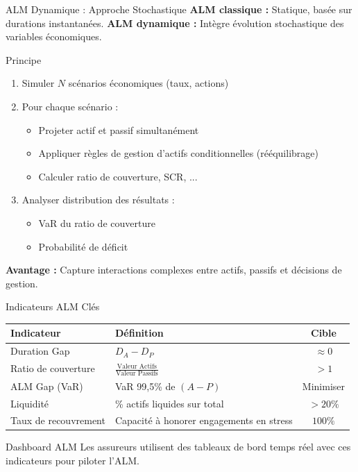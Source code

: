 \documentclass[10pt,aspectratio=169]{beamer}
\begin{document}
\begin{frame}{ALM Dynamique : Approche Stochastique}
\textbf{ALM classique : } Statique, basée sur durations instantanées.
\textbf{ALM dynamique : } Intègre évolution stochastique des variables économiques.

\vspace{0.3cm}
\begin{block}{Principe}
\begin{enumerate}
    \item Simuler $N$ scénarios économiques (taux, actions)
    \item Pour chaque scénario :
    \begin{itemize}
        \item Projeter actif et passif simultanément
        \item Appliquer règles de gestion d'actifs conditionnelles (rééquilibrage)
        \item Calculer ratio de couverture, SCR, ...
    \end{itemize}
    \item Analyser distribution des résultats :
    \begin{itemize}
        \item VaR du ratio de couverture
        \item Probabilité de déficit
    \end{itemize}
\end{enumerate}
\end{block}

\vspace{0.3cm}
\textbf{Avantage : } Capture interactions complexes entre actifs, passifs et décisions de gestion.
\end{frame}

\begin{frame}{Indicateurs ALM Clés}
\begin{table}
\centering
\small
\begin{tabular}{lp{6cm}c}
\toprule
\textbf{Indicateur} & \textbf{Définition} & \textbf{Cible} \\
\midrule
Duration Gap & $D_A - D_P$ & $\approx 0$ \\
\midrule
Ratio de couverture & $\frac{\text{Valeur Actifs}}{\text{Valeur Passifs}}$ & $> 1$ \\
\midrule
ALM Gap (VaR) & VaR 99,5\% de $(A - P)$ & Minimiser \\
\midrule
Liquidité & \% actifs liquides sur total & $> 20\%$ \\
\midrule
Taux de recouvrement & Capacité à honorer engagements en stress & $100\%$ \\
\bottomrule
\end{tabular}
\end{table}

\vspace{0.3cm}
\begin{exampleblock}{Dashboard ALM}
Les assureurs utilisent des tableaux de bord temps réel avec ces indicateurs pour piloter l'ALM.
\end{exampleblock}
\end{frame}
\end{document}
